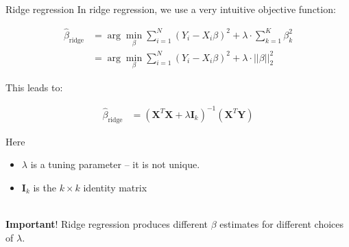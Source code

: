 \documentclass[mathserif, aspectratio=169]{beamer}
\begin{document}
\begin{frame}{Ridge regression}
In ridge regression, we use a very intuitive objective function:

\begin{align*}
\hat{\beta}_{\text{ridge}} &= \arg \min_\beta \sum_{i=1}^N \left(Y_i - X_i \beta \right)^2+\lambda \cdot \sum_{k=1}^K \beta_k^2\\
&= \arg \min_\beta \sum_{i=1}^N \left(Y_i - X_i \beta \right)^2+\lambda \cdot ||\beta||_2^2 
\end{align*}

This leads to:

\begin{align*}
\hat{\beta}_\text{ridge} &=\left(\mathbf{X}^T\mathbf{X} + \lambda\mathbf{I}_k\right)^{-1} \left(\mathbf{X}^T\mathbf{Y}\right)
\end{align*}

Here 
\begin{itemize}
\item $\lambda$ is a tuning parameter -- it is not unique.  
\item $\mathbf{I}_k$ is the $k\times k$ identity matrix\\~\\
\end{itemize}

\textbf{Important}! Ridge regression produces different $\beta$ estimates for different choices of $\lambda$.

\end{frame}
\end{document}
